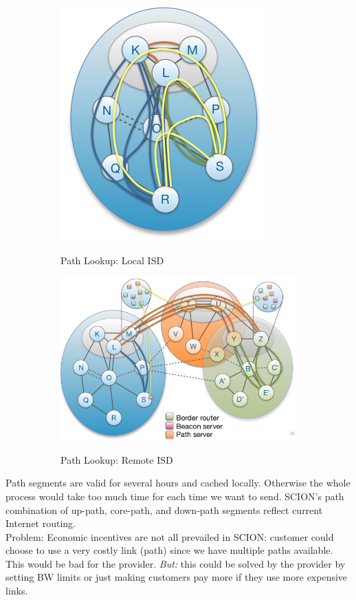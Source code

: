 \documentclass[11pt,oneside,a4paper]{article}
\begin{document}
\begin{figure}[t!]
	\centering
	\begin{subfigure}[t]{.5\textwidth}
		\centering
		\includegraphics[width=0.5\linewidth]{figures/scion_pathlookup_localisd}
		\label{fig:scion_pathlookup_localisd}
		\caption{Path Lookup: Local ISD}
	\end{subfigure}%
	\begin{subfigure}[t]{.5\textwidth}
		\centering
		\includegraphics[width=0.7\linewidth]{figures/scion_pathlookup_remoteisd}
		\label{fig:scion_pathlookup_remoteisd}
		\caption{Path Lookup: Remote ISD}
	\end{subfigure}
	\caption{}
\end{figure}

\noindent Path segments are valid for several hours and cached locally. Otherwise the whole process would take too much time for each time we want to send. SCION’s path combination of up-path, core-path, and down-path segments reflect current Internet routing.\\

\noindent Problem: Economic incentives are not all prevailed in SCION: customer could choose to use a very costly link (path) since we have multiple paths available. This would be bad for the provider. \textit{But:} this could be solved by the provider by setting BW limits or just making customers pay more if they use more expensive links.
\end{document}
